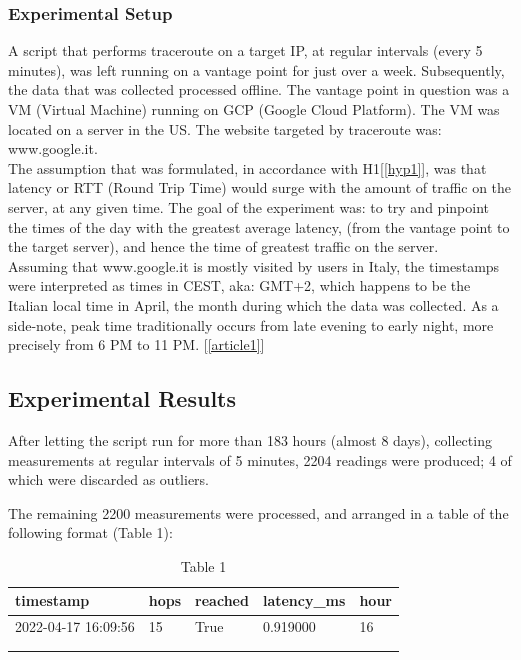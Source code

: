 \documentclass[a4paper,10pt]{article}
\begin{document}
\maketitle
\subsubsection{Experimental Setup}

A script that performs traceroute on a target IP, at regular intervals (every 5 minutes), was left running on a vantage point for just over a week. Subsequently, the data that was collected processed offline. The vantage point in question was a VM (Virtual Machine) running on GCP (Google Cloud Platform). The VM was located on a server in the US. The website targeted by traceroute was: www.google.it.\\

The assumption that was formulated, in accordance with H1[\ref{hyp1}], was that latency or RTT (Round Trip Time) would surge with the amount of traffic on the server, at any given time. The goal of the experiment was: to try and pinpoint the times of the day with the greatest average latency, (from the vantage point to the target server), and hence the time of greatest traffic on the server.\\

Assuming that www.google.it is mostly visited by users in Italy, the timestamps were interpreted as times in CEST, aka: GMT+2, which happens to be the Italian local time in April, the month during which the data was collected. As a side-note, peak time traditionally occurs from late evening to early night, more precisely from 6 PM to 11 PM. [\ref{article1}]\\


\subsection{Experimental Results}

After letting the script run for more than 183 hours (almost 8 days), collecting measurements at regular intervals of 5 minutes, 2204 readings were produced; 4 of which were discarded as outliers. 

The remaining 2200 measurements were processed, and arranged in a table of the following format (Table 1):


\begin{table}[h!]
\centering
\begin{tabular}{|l|l|l|l|l|}
\hline
timestamp           & hops & reached & latency\_ms & hour \\ \hline
2022-04-17 16:09:56 & 15   & True    & 0.919000    & 16   \\ \hline
                    &      &         &             &      \\ \hline
                    &      &         &             &     
\end{tabular}
\caption{Table 1}
\label{fig:table1}
\end{table}
\end{document}
